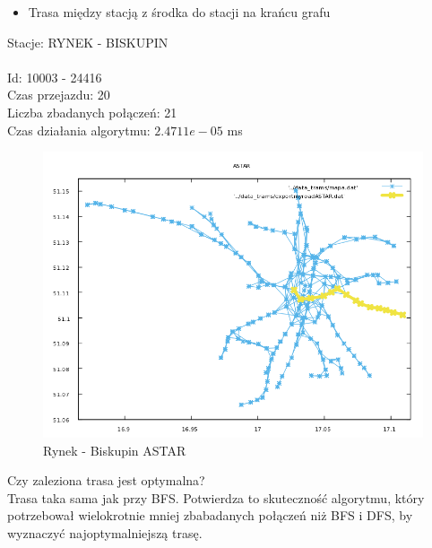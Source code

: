 \documentclass[13pt]{article}
\begin{document}
\newpage
\begin{itemize}
\item Trasa między stacją z środka do stacji na krańcu grafu
\end{itemize}
\hspace{1.5cm} Stacje: RYNEK - BISKUPIN\\\\
Id: 10003 - 24416\\
Czas przejazdu: 20\\
Liczba zbadanych połączeń: 21\\
Czas działania algorytmu: $2.4711e-05$ ms\\
\begin{figure}[hp]
\centering
\includegraphics[width=1\textwidth]{wykresy/RYN_BIS_ASTAR.png}
\caption{Rynek - Biskupin ASTAR}
\end{figure}

Czy zaleziona trasa jest optymalna?\\
Trasa taka sama jak przy BFS. Potwierdza to skuteczność algorytmu, który potrzebował wielokrotnie mniej zbabadanych połączeń niż BFS i DFS, by wyznaczyć najoptymalniejszą trasę.
\end{document}
